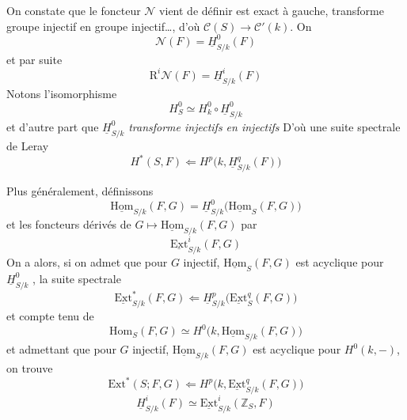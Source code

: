\documentclass[11pt,a4paper]{article}
\begin{document}
On constate que le foncteur $\mathcal{N}$  vient de définir
est exact à gauche,  transforme groupe injectif en groupe
injectif\ldots, d'où
$\mathcal{C}(S) \to \mathcal{C}'(k)$. On  
\[
\mathcal{N}(F) = \underline{H}^{0}_{S/k}(F)
\]
et \struck{\ill{}} par suite
\[
\mathrm{R}^{i}\mathcal{N}(F) = \underline{H}^{i}_{S/k}(F)
\]
Notons l'isomorphisme
\[
H^{0}_{S} \simeq H^{0}_{k} \circ \underline{H}^{0}_{S/k}
\]
et d'autre part que $\underline{H}^{0}_{S/k}$ \emph{transforme injectifs en
injectifs}
D'où une suite spectrale de Leray
\[
H^{*}(S, F) \Leftarrow H^{p}\bigl(k, \underline{H}^{q}_{S/k}(F)\bigr)
\]

Plus généralement, définissons
\[
\underline{\mathrm{Hom}}_{S/k}(F, G) = \underline{H}^{0}_{S/k}\bigl(\underline{\mathrm{Hom}}_{S}(F, G)\bigr)
\]
 et  les foncteurs dérivés de
$G \mapsto \underline{\mathrm{Hom}}_{S/k}(F, G)$ par
\[
\underline{\mathrm{Ext}}^{i}_{S/k}(F, G)
\]
On a alors, si on admet que pour $G$ injectif,
$\underline{\mathrm{Hom}}_{S}(F, G)$ est acyclique pour
$\underline{H}^{0}_{S/k}$ ,
la suite spectrale
\[
\underline{\mathrm{Ext}}^{*}_{S/k}(F, G) \Leftarrow \underline{H}^{p}_{S/k}\bigl(\underline{\mathrm{Ext}}^{q}_{S}(F, G)\bigr)
\]
et compte tenu de
\[
\mathrm{Hom}_{S}(F, G) \simeq H^{0}\bigl(k, \underline{\mathrm{Hom}}_{S/k}(F, G)\bigr)
\]
et admettant que pour $G$ injectif, $\underline{\mathrm{Hom}}_{S/k}(F, G)$ est
acyclique pour $H^{0}(k, -)$, on trouve
\[
\mathrm{Ext}^{*}(S; F, G) \Leftarrow H^{p}\bigl(k, \underline{\mathrm{Ext}}^{q}_{S/k}(F, G)\bigr)
\]
 
\[
\underline{H}^{i}_{S/k}(F) \simeq \underline{\mathrm{Ext}}^{i}_{S/k}(\mathbb{Z}_{S}, F)
\]
\end{document}
